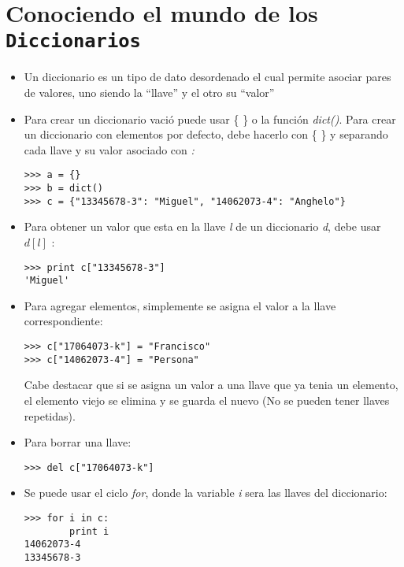 \section*{Conociendo el mundo de los \texttt{Diccionarios}}

\begin{itemize}
\item Un diccionario es un tipo de dato desordenado el cual permite asociar pares de valores, uno siendo la ``llave'' y el otro su ``valor''

\item Para crear un diccionario vació puede usar \{ \} o la función \textit{dict()}. Para crear un diccionario con elementos por defecto, debe hacerlo con \{ \} y separando cada llave y su valor asociado con \textit{:}
\begin{lstlisting}[style=consola]
>>> a = {}
>>> b = dict()
>>> c = {"13345678-3": "Miguel", "14062073-4": "Anghelo"}
\end{lstlisting}


\item Para obtener un valor que esta en la llave \textit{l} de un diccionario \textit{d}, debe usar $d[l]$ :
\begin{lstlisting}[style=consola]
>>> print c["13345678-3"]
'Miguel'
\end{lstlisting}

\item Para agregar elementos, simplemente se asigna el valor a la llave correspondiente:
\begin{lstlisting}[style=consola]
>>> c["17064073-k"] = "Francisco"
>>> c["14062073-4"] = "Persona"
\end{lstlisting}

Cabe destacar que si se asigna un valor a una llave que ya tenia un elemento, el elemento viejo se elimina y se guarda el nuevo (No se pueden tener llaves repetidas).

\item Para borrar una llave:
\begin{lstlisting}[style=consola]
>>> del c["17064073-k"]
\end{lstlisting}

\item Se puede usar el ciclo \textit{for}, donde la variable \textit{i} sera las llaves del diccionario:
\begin{lstlisting}[style=consola]
>>> for i in c:
        print i
14062073-4
13345678-3
\end{lstlisting}


\end{itemize}
